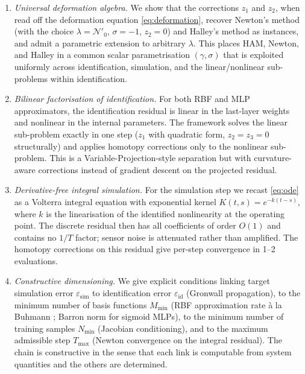 \documentclass[preprint,12pt,numbers]{elsarticle}
\begin{document}
\begin{enumerate}[label=(C\arabic*),leftmargin=*]
\item \emph{Universal deformation algebra.} We show that the corrections
$z_1$ and $z_2$, when read off the deformation equation
\eqref{eq:deformation}, recover Newton's method (with the choice
$\lambda = \mathcal{N}'_0$, $\sigma = -1$, $z_2 = 0$) and Halley's
method as instances, and admit a parametric extension to arbitrary
$\lambda$. This places HAM, Newton, and Halley in a common scalar
parametrisation $(\gamma, \sigma)$ that is exploited uniformly across
identification, simulation, and the linear/nonlinear sub-problems
within identification.

\item \emph{Bilinear factorisation of identification.} For both RBF and MLP
approximators, the identification residual is linear in the last-layer
weights and nonlinear in the internal parameters. The framework solves
the linear sub-problem exactly in one step ($z_1$ with quadratic form,
$z_2 = z_3 = 0$ structurally) and applies homotopy corrections only to
the nonlinear sub-problem. This is a Variable-Projection-style separation
\cite{GolubPereyra1973,Sjolund2014} but with curvature-aware
corrections instead of gradient descent on the projected residual.

\item \emph{Derivative-free integral simulation.} For the simulation step
we recast \eqref{eq:ode} as a Volterra integral equation with
exponential kernel $K(t,s) = e^{-k(t-s)}$, where $k$ is the linearisation
of the identified nonlinearity at the operating point. The discrete
residual then has all coefficients of order $O(1)$ and contains no
$1/T$ factor; sensor noise is attenuated rather than amplified. The
homotopy corrections on this residual give per-step convergence in
1--2 evaluations.

\item \emph{Constructive dimensioning.} We give explicit conditions linking
target simulation error $\varepsilon_{\mathrm{sim}}$ to identification
error $\varepsilon_{\mathrm{id}}$ (Gronwall propagation), to the
minimum number of basis functions $M_{\min}$ (RBF approximation rate
\`a la Buhmann \citeyear{Buhmann2003}; Barron norm \citeyear{Barron1993}
for sigmoid MLPs), to the minimum number of training samples $N_{\min}$
(Jacobian conditioning), and to the maximum admissible step $T_{\max}$
(Newton convergence on the integral residual). The chain is
constructive in the sense that each link is computable from system
quantities and the others are determined.


\end{enumerate}
\end{document}
